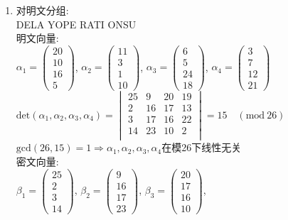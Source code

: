\documentclass[12pt]{article}
\begin{document}
\begin{enumerate}
\item
对明文分组:\\
DELA YOPE RATI ONSU\\
明文向量:\\
$\alpha_1=\begin{pmatrix}20\\10\\16\\5\end{pmatrix}$,
$\alpha_2=\begin{pmatrix}11\\3\\1\\10\end{pmatrix}$,
$\alpha_3=\begin{pmatrix}6\\5\\24\\18\end{pmatrix}$,
$\alpha_4=\begin{pmatrix}3\\7\\12\\21\end{pmatrix}$\\
$\mathrm{det}(\alpha_1,\alpha_2,\alpha_3,\alpha_4)=
\begin{vmatrix}
   25 &   9   &20&   19\\
    2  & 16  & 17 &  13\\
    3   &17 &  16  & 22\\
   14   &23&   10   & 2\\
\end{vmatrix}
=15\quad(\mathrm{mod}~26)
$\\
$\mathrm{gcd}(26,15)=1\Rightarrow\alpha_1,\alpha_2,\alpha_3,\alpha_4$在模26下线性无关\\
密文向量:\\
$\beta_1=\begin{pmatrix}25\\2\\3\\14\end{pmatrix}$,
$\beta_2=\begin{pmatrix}9\\16\\17\\23\end{pmatrix}$,
$\beta_3=\begin{pmatrix}20\\17\\16\\10\end{pmatrix}$,

\end{enumerate}
\end{document}
